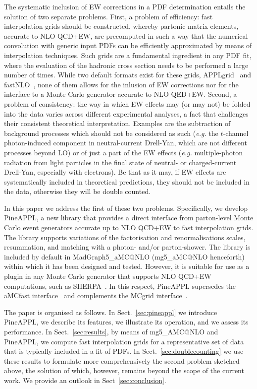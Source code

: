 The systematic inclusion of EW corrections in a PDF determination entails
the solution of two separate problems. First, a problem of efficiency:
fast interpolation grids should be constructed, whereby partonic matrix 
elements, accurate to NLO QCD+EW, are precomputed in such a way that the 
numerical convolution with generic input PDFs can be efficiently approximated
by means of interpolation techniques. Such grids are a fundamental ingredient
in any PDF fit, where the evaluation of the hadronic cross section needs to 
be performed a large number of times. While two default formats exist for
these grids, {\sc APPLgrid}~\cite{Carli:2010rw} and 
{\sc fastNLO}~\cite{Kluge:2006xs}, none of them allows for the inlusion of EW
corrections nor for the interface to a Monte Carlo generator accurate to 
NLO QED+EW. Second, a problem of consistency: the way in which EW effects may
(or may not) be folded into the data varies across different experimental 
analyses, a fact that challenges their consistent theoretical interpretation. 
Examples are the subtraction of background processes which should not be 
considered as such ({\it e.g.} the $t$-channel photon-induced component in 
neutral-current Drell-Yan, which are not different processes beyond LO) or of 
just a part of the EW effects ({\it e.g.} multiple-photon radiation from light 
particles in the final state of neutral- or charged-current Drell-Yan, 
especially with electrons). Be that as it may, if EW effects are systematically
included in theoretical predictions, they should not be included in the data,
otherwise they will be double counted.

In this paper we address the first of these two problems. Specifically, 
we develop {\sc PineAPPL}, a new library that provides a direct interface 
from parton-level Monte Carlo event generators accurate up to NLO QCD+EW to
fast interpolation grids. The library supports variations of the factorisation
and renormalisations scales, resummation, and matching with a photon- and/or
parton-shower. The library is included by default in 
{\sc MadGraph5\_aMC@NLO} ({\sc mg5\_aMC@NLO} henceforth) within which it has 
been designed and tested. However, it is suitable for use as a plugin in any 
Monte Carlo generator that supports NLO QCD+EW computations, such as 
{\sc SHERPA}~\cite{Biedermann:2017yoi}. In this respect, {\sc PineAPPL}
supersedes the {\sc aMCfast} interface~\cite{Bertone:2014zva} and complements
the {\sc MCgrid} interface~\cite{DelDebbio:2013kxa,Bothmann:2015dba}.

The paper is organised as follows. In Sect.~\ref{sec:pineappl} we introduce
{\sc PineAPPL}, we describe its features, we illustrate its operation, and we
assess its performance. In Sect.~\ref{sec:results}, by means of 
{\sc mg5\_AMC@NLO} and {\sc PineAPPL}, we compute fast interpolation grids for 
a representative set of data that is typically included in a fit of PDFs.
In Sect.~\ref{sec:doublecounting} we use these results to formulate more 
comprehensively the second problem sketched above, the solution of which, 
however, remains beyond the scope of the current work. We provide an outlook in
Sect~\ref{sec:conclusion}.

